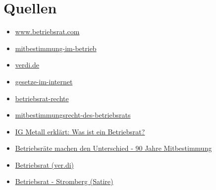 \documentclass[
  a4paper,            %
  DIV=10,             %
  oneside,            %
  BCOR=5mm,           %
  parskip=half,       %
  numbers=noenddot    %
]{scrartcl}
\begin{document}
\section{Quellen}
   \begin{itemize}
   	\item 
   	\href{https://www.betriebsrat.com/wissen/betriebsrat/mitbestimmung}{www.betriebsrat.com}
   	\item  
   	\href{https://www.bwl-lexikon.de/wiki/mitbestimmung-im-betrieb/}{mitbestimmung-im-betrieb}
	\item 
	\href{https://www.verdi.de/themen/arbeit/++co++743d550e-7794-11ec-9146-001a4a16012a}{verdi.de}
	\item
	\href{http://www.gesetze-im-internet.de/betrvg/index.html}{gesetze-im-internet} 
	\item 
	\href{https://kluge-seminare.de/br-portal/wissen/allgemeines/betriebsrat-rechte/}{betriebsrat-rechte}
	\item 
	\href{https://www.bwl-lexikon.de/wiki/mitbestimmungsrecht-des-betriebsrats/}{mitbestimmungsrecht-des-betriebsrats}
	\item 
	\href{https://youtu.be/aPiJ-byyQyU}{IG Metall erklärt: Was ist ein Betriebsrat?}
	\item
	\href{https://youtu.be/7nTdul3NSA4}{Betriebsräte machen den Unterschied - 90 Jahre Mitbestimmung}
	\item
	\href{https://youtu.be/MrKcdzwGqcw}{Betriebsrat (ver.di)}
	\item
	\href{https://youtu.be/GS_Ea9SezAs}{Betriebsrat - Stromberg (Satire)}
\end{itemize}

%
%

\clearpage
\end{document}

